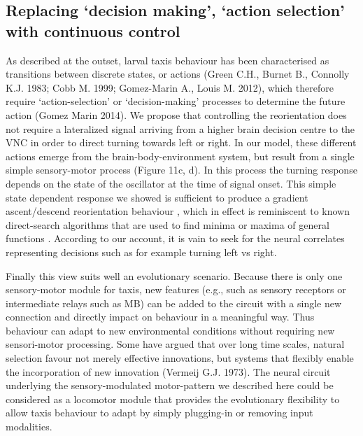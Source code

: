 \documentclass[10pt,a4paper]{article}
\begin{document}
\subsection{Replacing ‘decision making’, ‘action selection’ with continuous control}
As described at the outset, larval taxis behaviour has been characterised as transitions between discrete states, or actions (Green C.H., Burnet B., Connolly K.J. 1983; Cobb M. 1999; Gomez-Marin A., Louis M. 2012), which therefore require ‘action-selection’ or ‘decision-making’ processes to determine the future action (Gomez Marin 2014).
  We propose that controlling the reorientation does not require a lateralized signal arriving from a higher brain decision centre to the VNC in order to direct turning towards left or right.
   In our model, these different actions emerge from the brain-body-environment system, but result from a single simple sensory-motor process (Figure 11c, d).
    In this process the turning response depends on the state of the oscillator at the time of signal onset. This simple state dependent response we showed is sufficient to produce a gradient ascent/descend reorientation behaviour \cite[see][ for example]{izquierdo2010evolution}, which in effect is reminiscent to known direct-search algorithms that are used to find minima or maxima of general functions \cite[see]{snyman2005line}. 
According to our account, it is vain to seek for the neural correlates representing decisions such as for example turning left vs right.


Finally this view suits well an evolutionary scenario. 
Because there is only one sensory-motor module for taxis, new features (e.g., such as sensory receptors or intermediate relays such as MB) can be added to the circuit with a single new connection and directly impact on behaviour in a meaningful way. Thus behaviour can adapt to new environmental conditions  without requiring new sensori-motor processing. Some have argued that over long time scales, natural selection favour not merely effective innovations, but systems that flexibly enable the incorporation of new innovation (Vermeij G.J. 1973). The neural circuit underlying the sensory-modulated motor-pattern we described here could be considered as a locomotor module that provides the evolutionary flexibility to allow taxis behaviour to adapt by simply plugging-in or removing input modalities. 
\end{document}

